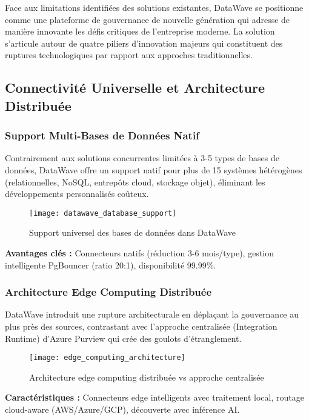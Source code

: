 Face aux limitations identifiées des solutions existantes, DataWave se positionne comme une plateforme de gouvernance de nouvelle génération qui adresse de manière innovante les défis critiques de l'entreprise moderne. La solution s'articule autour de quatre piliers d'innovation majeurs qui constituent des ruptures technologiques par rapport aux approches traditionnelles.

\subsection{Connectivité Universelle et Architecture Distribuée}

\subsubsection{Support Multi-Bases de Données Natif}

Contrairement aux solutions concurrentes limitées à 3-5 types de bases de données, DataWave offre un support natif pour plus de 15 systèmes hétérogènes (relationnelles, NoSQL, entrepôts cloud, stockage objet), éliminant les développements personnalisés coûteux.

\begin{figure}[htpb]
\centering
\texttt{[image: datawave\_database\_support]}
\caption{Support universel des bases de données dans DataWave}
\label{fig:datawave_db_support}
\end{figure}

\textbf{Avantages clés :} Connecteurs natifs (réduction 3-6 mois/type), gestion intelligente PgBouncer (ratio 20:1), disponibilité 99.99\%.

\subsubsection{Architecture Edge Computing Distribuée}

DataWave introduit une rupture architecturale en déplaçant la gouvernance au plus près des sources, contrastant avec l'approche centralisée (Integration Runtime) d'Azure Purview qui crée des goulots d'étranglement.

\begin{figure}[htpb]
\centering
\texttt{[image: edge\_computing\_architecture]}
\caption{Architecture edge computing distribuée vs approche centralisée}
\label{fig:edge_computing}
\end{figure}

\textbf{Caractéristiques :} Connecteurs edge intelligents avec traitement local, routage cloud-aware (AWS/Azure/GCP), découverte avec inférence AI.

